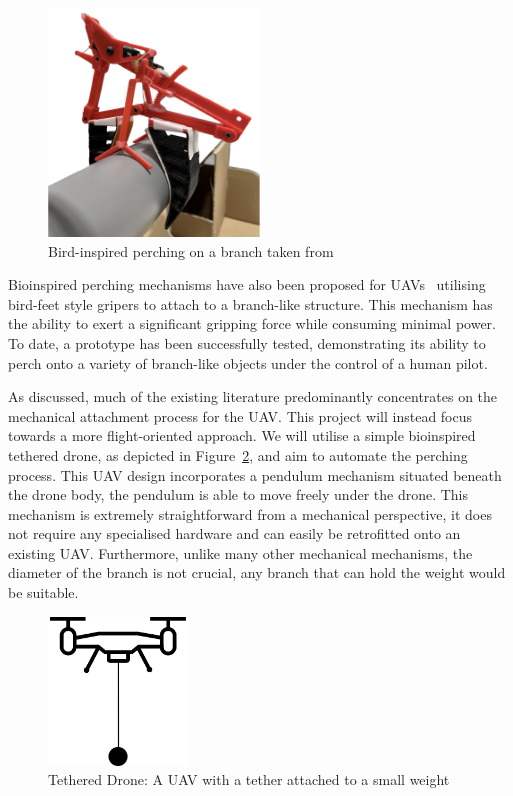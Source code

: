 \begin{figure}[htbp]
  \centering
  \includegraphics[width=0.5\textwidth]{background/perching-tum.png}
  \caption{Bird-inspired perching on a branch taken from~\cite{perching-tum-bird}}
\label{fig:perching-tum-bird}
\end{figure}

Bioinspired perching mechanisms have also been proposed for UAVs~\cite{perching-tum-bird} utilising bird-feet style gripers to attach to a branch-like structure.
This mechanism has the ability to exert a significant gripping force while consuming minimal power.
To date, a prototype has been successfully tested, demonstrating its ability to perch onto a variety of branch-like objects under the control of a human pilot.

As discussed, much of the existing literature predominantly concentrates on the mechanical attachment process for the UAV.
This project will instead focus towards a more flight-oriented approach.
We will utilise a simple bioinspired tethered drone, as depicted in Figure~\ref{fig:background-tethered-drone}, and aim to automate the perching process.
This UAV design incorporates a pendulum mechanism situated beneath the drone body, the pendulum is able to move freely under the drone.
This mechanism is extremely straightforward from a mechanical perspective, it does not require any specialised hardware and can easily be retrofitted onto an existing UAV.
Furthermore, unlike many other mechanical mechanisms, the diameter of the branch is not crucial, any branch that can hold the weight would be suitable.

\begin{figure}[H]
  \centering
  \includegraphics[width=0.33\textwidth]{introduction/TetheredDrone.drawio.png}
  \caption{Tethered Drone: A UAV with a tether attached to a small weight}
\label{fig:background-tethered-drone}
\end{figure}

